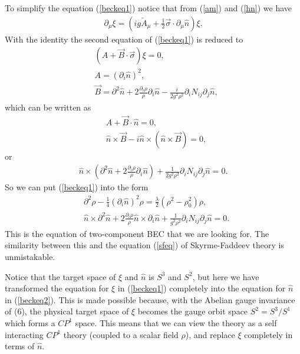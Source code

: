 \documentclass[twocolumn,showpacs,showkeys]{revtex4}
\newcommand{\bea}{\begin{eqnarray}}
\newcommand{\eea}{\end{eqnarray}}
\newcommand{\pro}{\partial}
\newcommand{\n}{\hat n}
\newcommand{\B}{{\vec B}}
\newcommand{\dfrac}{\displaystyle\frac}
\newcommand{\nn}{\nonumber}
\newcommand{\hn}{\hat n}
\begin{document}
To simplify the equation (\ref{beckeq1}) notice that 
from (\ref{am}) and (\ref{hn}) we have
\bea
\pro_\mu \xi = (ig \tilde A_\mu + \dfrac{1}{2} \vec \sigma
\cdot \pro_\mu \n) \xi.
\eea
With the identity the second equation of (\ref{beckeq1}) is reduced to 
\bea
&(A + \B \cdot \vec \sigma) \xi = 0, \nn\\
&A = (\pro_i \n)^2, \nn \\
&\B = \pro^2 \n + 2 \dfrac{\pro_i \rho}{\rho} \pro_i \n
- \dfrac{i}{2 g^2 \rho^2} \pro_i N_{ij} \pro_j \n, 
\eea
which can be written as
\bea
&A+ \vec B \cdot \hn=0, \nn\\
& \hn \times \vec B - i \hn \times (\hn \times \vec B) =0,
\eea
or 
\bea
\n \times (\pro^2 \n + 2 \dfrac{\pro_i \rho}{\rho} \pro_i \n) 
+ \dfrac{1}{2 g^2 \rho^2} \pro_i N_{ij} \pro_j \n = 0.
\eea
So we can put (\ref{beckeq1}) into the form
\bea
&\pro^2 \rho - \dfrac{1}{4} (\pro_i \n)^2 \rho 
= \dfrac{\lambda}{2}(\rho^2 - \rho_0^2)
\rho, \nn \\
&\n \times \pro^2 \n + 2 \dfrac{\pro_i \rho}{\rho} \n \times \pro_i
\n + \dfrac{1}{g^2\rho^2} \pro_i N_{ij} \pro_j \n = 0.
\label{beckeq2}
\eea
This is the equation of two-component BEC that we are 
looking for. The similarity between this and the equation 
(\ref{sfeq}) of Skyrme-Faddeev theory is unmistakable.

Notice that the target space of $\xi$ and $\n$ is $S^3$ and
$S^2$, but here we have transformed the equation for $\xi$
in (\ref{beckeq1}) completely into the equation
for $\n$ in (\ref{beckeq2}).
This is made possible because, with the Abelian gauge invariance of (6),
the physical target space of $\xi$ becomes the gauge orbit space
$S^2 = S^3/S^1$ which forms a $CP^1$ space.
This means that we can view the theory as a self interacting
$CP^1$ theory (coupled to a scalar field $\rho$), and replace
$\xi$ completely in terms of $\n$.
\end{document}

